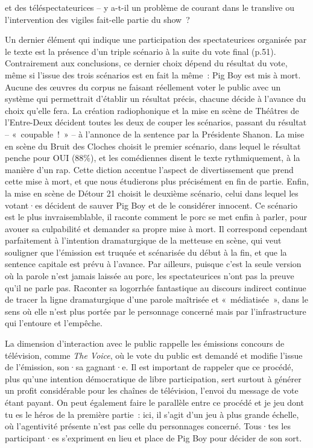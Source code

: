 \documentclass[
]{article}
\begin{document}
et des téléspectateurices -- y a-t-il un problème de courant dans le translive ou l'intervention des vigiles fait-elle partie du show~?

Un dernier élément qui indique une participation des spectateurices organisée par le texte est la présence d'un triple scénario à la suite du vote final (p.51). Contrairement aux conclusions, ce dernier choix dépend du résultat du vote, même si l'issue des trois scénarios est en fait la même~: Pig Boy est mis à mort. Aucune des œuvres du corpus ne faisant réellement voter le public avec un système qui permettrait d'établir un résultat précis, chacune décide à l'avance du choix qu'elle fera. La création radiophonique et la mise en scène de Théâtres de l'Entre-Deux décident toutes les deux de couper les scénarios, passant du résultat -- «~coupable~!~» -- à l'annonce de la sentence par la Présidente Shanon. La mise en scène du Bruit des Cloches choisit le premier scénario, dans lequel le résultat penche pour OUI (88\%), et les comédiennes disent le texte rythmiquement, à la manière d'un rap. Cette diction accentue l'aspect de divertissement que prend cette mise à mort, et que nous étudierons plus précisément en fin de partie. Enfin, la mise en scène de Détour 21 choisit le deuxième scénario, celui dans lequel les votant·es décident de sauver Pig Boy et de le considérer innocent. Ce scénario est le plus invraisemblable, il raconte comment le porc se met enfin à parler, pour avouer sa culpabilité et demander sa propre mise à mort. Il correspond cependant parfaitement à l'intention dramaturgique de la metteuse en scène, qui veut souligner que l'émission est truquée et scénarisée du début à la fin, et que la sentence capitale est prévu à l'avance. Par ailleurs, puisque c'est la seule version où la parole n'est jamais laissée au porc, les spectateurices n'ont pas la preuve qu'il ne parle pas. Raconter sa logorrhée fantastique au discours indirect continue de tracer la ligne dramaturgique d'une parole maîtrisée et «~médiatisée~», dans le sens où elle n'est plus portée par le personnage concerné mais par l'infrastructure qui l'entoure et l'empêche.

La dimension d'interaction avec le public rappelle les émissions concours de télévision, comme \emph{The Voice}, où le vote du public est demandé et modifie l'issue de l'émission, son·sa gagnant·e. Il est important de rappeler que ce procédé, plus qu'une intention démocratique de libre participation, sert surtout à générer un profit considérable pour les chaînes de télévision, l'envoi du message de vote étant payant. On peut également faire le parallèle entre ce procédé et je jeu dont tu es le héros de la première partie~: ici, il s'agit d'un jeu à plus grande échelle, où l'agentivité présente n'est pas celle du personnages concerné. Tous·tes les participant·es s'expriment en lieu et place de Pig Boy pour décider de son sort.
\end{document}
